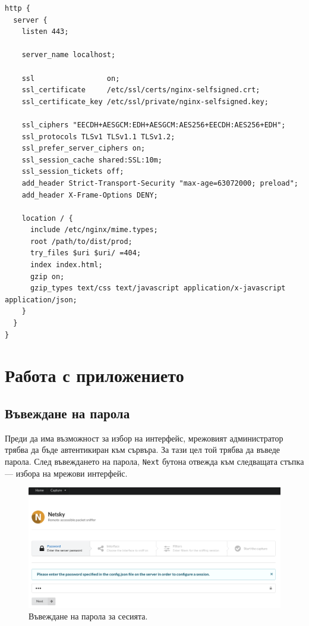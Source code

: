 \documentclass[12pt,a4paper,oneside]{book}
\begin{document}
\begin{lstlisting}[caption=Примерна конфигурация за nginx: \texttt{/etc/nginx/nginx.conf}]
http {
  server {
    listen 443;

    server_name localhost;

    ssl                 on;
    ssl_certificate     /etc/ssl/certs/nginx-selfsigned.crt;
    ssl_certificate_key /etc/ssl/private/nginx-selfsigned.key;

    ssl_ciphers "EECDH+AESGCM:EDH+AESGCM:AES256+EECDH:AES256+EDH";
    ssl_protocols TLSv1 TLSv1.1 TLSv1.2;
    ssl_prefer_server_ciphers on;
    ssl_session_cache shared:SSL:10m;
    ssl_session_tickets off;
    add_header Strict-Transport-Security "max-age=63072000; preload";
    add_header X-Frame-Options DENY;

    location / {
      include /etc/nginx/mime.types;
      root /path/to/dist/prod;
      try_files $uri $uri/ =404;
      index index.html;
      gzip on;
      gzip_types text/css text/javascript application/x-javascript application/json;
    }
  }
}
\end{lstlisting}

\section{Работа с приложението}

\subsection{Въвеждане на парола}

Преди да има възможност за избор на интерфейс, мрежовият администратор
трябва да бъде автентикиран към сървъра. За тази цел той трябва да въведе парола.
След въвеждането на парола, \texttt{Next} бутона отвежда към следващата стъпка ---
избора на мрежови интерфейс.

\begin{figure}[h!]
  \centering
  \includegraphics[width=\textwidth]{figures/screenshots/password.png}
  \caption{Въвеждане на парола за сесията.}
  \label{screenshots_password_fig}
\end{figure}
\end{document}
